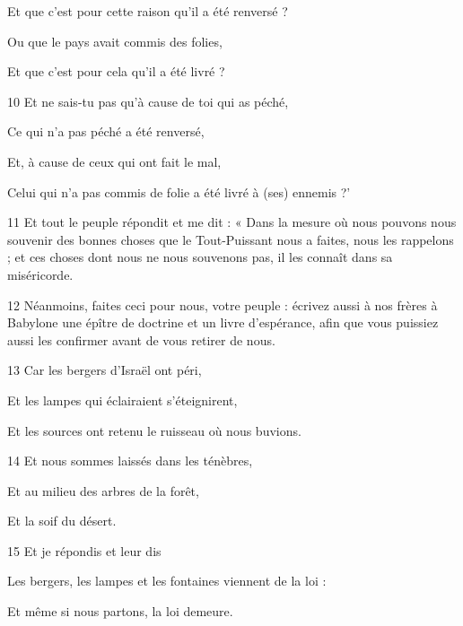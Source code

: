 \par Et que c'est pour cette raison qu'il a été renversé ?

\par Ou que le pays avait commis des folies,

\par Et que c'est pour cela qu'il a été livré ?

\par 10 Et ne sais-tu pas qu'à cause de toi qui as péché,

\par Ce qui n'a pas péché a été renversé,

\par Et, à cause de ceux qui ont fait le mal,

\par Celui qui n'a pas commis de folie a été livré à (ses) ennemis ?'

\par 11 Et tout le peuple répondit et me dit : « Dans la mesure où nous pouvons nous souvenir des bonnes choses que le Tout-Puissant nous a faites, nous les rappelons ; et ces choses dont nous ne nous souvenons pas, il les connaît dans sa miséricorde.

\par 12 Néanmoins, faites ceci pour nous, votre peuple : écrivez aussi à nos frères à Babylone une épître de doctrine et un livre d'espérance, afin que vous puissiez aussi les confirmer avant de vous retirer de nous.

\par 13 Car les bergers d'Israël ont péri,

\par Et les lampes qui éclairaient s'éteignirent,

\par Et les sources ont retenu le ruisseau où nous buvions.

\par 14 Et nous sommes laissés dans les ténèbres,

\par Et au milieu des arbres de la forêt,

\par Et la soif du désert.

\par 15 Et je répondis et leur dis

\par Les bergers, les lampes et les fontaines viennent de la loi :

\par Et même si nous partons, la loi demeure.

